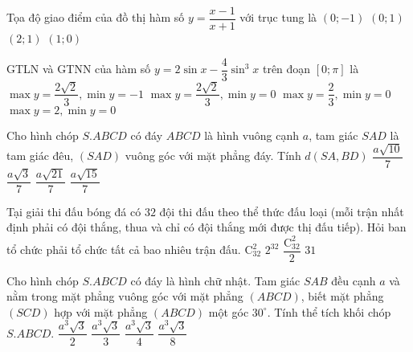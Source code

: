 \begin{ex}%
Tọa độ giao điểm của đồ thị hàm số $y=\dfrac{x-1}{x+1} $ với trục tung là
\choice
{\True $(0; -1)$}
{$(0; 1)$}
{$(2;1)$}
{$(1; 0)$}
\end{ex}

\begin{ex}%
GTLN và GTNN của hàm số $y=2\sin x-\dfrac{4}{3}\sin^3 x$ trên đoạn $[0; \pi]$ là
\choice
{$\max y= \dfrac{2\sqrt{2}}{3}, \min y =-1$}
{\True$\max y= \dfrac{2\sqrt{2}}{3}, \min y =0$}
{$\max y= \dfrac{2}{3}, \min y =0$}
{$\max y= 2, \min y =0$}
\end{ex}

\begin{ex}%
Cho hình chóp $S.ABCD$ có đáy $ABCD$ là hình vuông cạnh $a$, tam giác $SAD$ là tam giác đêu, $(SAD)$ vuông góc với mặt phẳng đáy. Tính $d(SA, BD)$
\choice
{$\dfrac{a\sqrt{10}}{7}$}
{$\dfrac{a\sqrt{3}}{7}$}
{\True $\dfrac{a\sqrt{21}}{7}$}
{$\dfrac{a\sqrt{15}}{7}$}
\end{ex}

\begin{ex}%
Tại giải thi đấu bóng đá có $32$ đội thi đấu theo thể thức đấu loại (mỗi trận nhất định phải có đội thắng, thua và chỉ có đội thắng mới được thị đấu tiếp). Hỏi ban tổ chức phải tổ chức tất cả bao nhiêu trận đấu.
\choice
{$\mathrm{C}_32^2$}
{$2^32$}
{$\dfrac{\mathrm{C}_32^2}{2}$}
{\True $31$}
\end{ex}

\begin{ex}%
Cho hình chóp $S.ABCD$ có đáy là hình chữ nhật. Tam giác $SAB$ đều cạnh $a$ và nằm trong mặt phẳng vuông góc với mặt phẳng $(ABCD)$, biết mặt phẳng $(SCD)$ hợp với mặt phẳng $(ABCD)$ một góc $30^{\circ}$. Tính thể tích khối chóp $S.ABCD$.
\choice
{$\dfrac{a^3\sqrt{3}}{2}$}
{$\dfrac{a^3\sqrt{3}}{3}$}
{\True $\dfrac{a^3\sqrt{3}}{4}$}
{$\dfrac{a^3\sqrt{3}}{8}$}
\end{ex}

